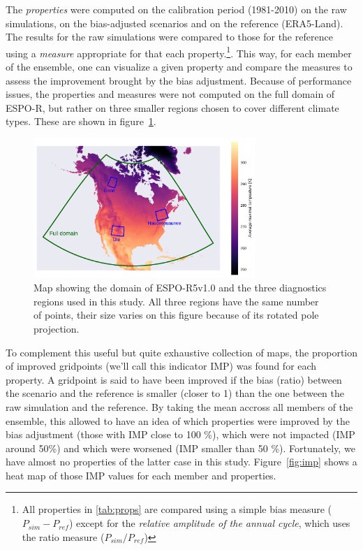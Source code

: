\documentclass[letterpaper,10pt]{article}
\begin{document}
The \emph{properties} were computed on the calibration period (1981-2010) on the raw simulations, on the bias-adjusted scenarios and on the reference (ERA5-Land). The results for the raw simulations were compared to those for the reference using a \emph{measure} appropriate for that each property.\footnote{All properties in \ref{tab:props} are compared using a simple bias measure ($P_{sim} - P_{ref}$) except for the \emph{relative amplitude of the annual cycle}, which uses the ratio measure ($P_{sim} / P_{ref}$)}. This way, for each member of the ensemble, one can visualize a given property and compare the measures to assess the improvement brought by the bias adjustment. Because of performance issues, the properties and measures were not computed on the full domain of ESPO-R, but rather on three smaller regions chosen to cover different climate types. These are shown in figure~\ref{fig:map}.

\begin{figure}
    \centering
    \includegraphics[width=0.75\textwidth]{../images/regions_domain_map.pdf}
    \caption{Map showing the domain of ESPO-R5v1.0 and the three diagnostics regions used in this study. All three regions have the same number of points, their size varies on this figure because of its rotated pole projection.}\label{fig:map}
\end{figure}

To complement this useful but quite exhaustive collection of maps, the proportion of improved gridpoints (we'll call this indicator IMP) was found for each property. A gridpoint is said to have been improved if the bias (ratio) between the scenario and the reference is smaller (closer to 1) than the one between the raw simulation and the reference. By taking the mean accross all members of the ensemble, this allowed to have an idea of which properties were improved by the bias adjustment (those with IMP close to 100 \%), which were not impacted (IMP around 50\%) and which were worsened (IMP smaller than 50 \%). Fortunately, we have almost no properties of the latter case in this study. Figure~\ref{fig:imp} shows a heat map of those IMP values for each member and properties.
\end{document}
